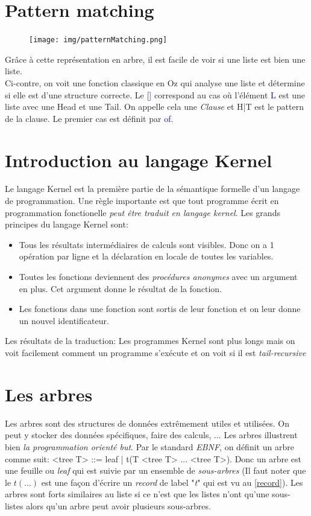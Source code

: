 \documentclass{report}
\begin{document}
\section{Pattern matching}
\begin{figure}
	\centering
	\texttt{[image: img/patternMatching.png]}
\end{figure}
Grâce à cette représentation en arbre, il est facile de voir si une liste est bien une liste.\\
Ci-contre, on voit une fonction classique en Oz qui analyse une liste et détermine si elle est d'une structure correcte. Le \textcolor{blue}{[]} correspond au cas où l'élément \textcolor{blue}{L} est une liste avec une Head et une Tail. On appelle cela une \textit{Clause} et H|T est le pattern de la clause. Le premier cas est définit par \textcolor{blue}{of}.
\newpage

\section{Introduction au langage Kernel}
Le langage Kernel est la première partie de la sémantique formelle d'un langage de programmation. Une règle importante est que tout programme écrit en programmation fonctionelle \textit{peut être traduit en langage kernel}.
Les grands principes du langage Kernel sont:
\begin{itemize}
	\item Tous les résultats intermédiaires de calculs sont visibles. Donc on a 1 opération par ligne et la déclaration en locale de toutes les variables.
	\item Toutes les fonctions deviennent des \textit{procédures anonymes} avec un argument en plus. Cet argument donne le résultat de la fonction.
	\item Les fonctions dans une fonction sont sortis de leur fonction et on leur donne un nouvel identificateur.
\end{itemize}
Les résultats de la traduction: Les programmes Kernel sont plus longs mais on voit facilement comment un programme s'exécute et on voit si il est \textit{tail-recursive}

\section{Les arbres}
Les arbres sont des structures de données extrêmement utiles et utilisées. On peut y stocker des données spécifiques, faire des calculs, ... Les arbres illustrent bien \textit{la programmation orienté but}. Par le standard \textit{EBNF}, on définit un arbre comme suit: <tree T> ::= leaf | t(T <tree T> ... <tree T>). Donc un arbre est une feuille ou \textit{leaf} qui est suivie par un ensemble de \textit{sous-arbres} (Il faut noter que le $t(...)$ est une façon d'écrire un \textit{record} de label "\textit{t}" qui est vu au \ref{record}). Les arbres sont forts similaires au liste si ce n'est que les listes n'ont qu'une sous-listes alors qu'un arbre peut avoir plusieurs sous-arbres.
\end{document}
